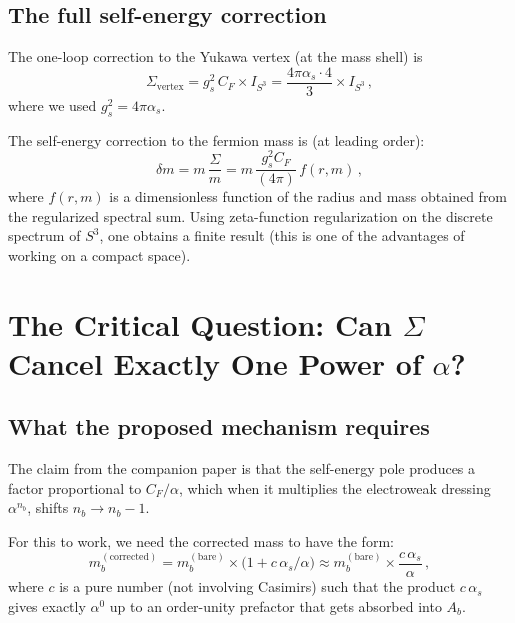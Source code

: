 \documentclass[11pt,a4paper]{article}
\theoremstyle{definition}
\theoremstyle{remark}
\begin{document}
\subsection{The full self-energy correction}
\label{sec:full-sigma}

The one-loop correction to the Yukawa vertex (at the mass shell) is
\begin{equation}\label{eq:sigma-full}
\Sigma_{\mathrm{vertex}} = g_s^2\,C_F \times I_{S^3}
= \frac{4\pi\alpha_s \cdot 4}{3}\times I_{S^3}\,,
\end{equation}
where we used $g_s^2 = 4\pi\alpha_s$.

The self-energy correction to the fermion mass is (at leading order):
\begin{equation}\label{eq:mass-correction}
\delta m = m\,\frac{\Sigma}{m} = m\,\frac{g_s^2 C_F}{(4\pi)}\,f(r,m)\,,
\end{equation}
where $f(r,m)$ is a dimensionless function of the radius and mass
obtained from the regularized spectral sum.  Using zeta-function
regularization on the discrete spectrum of $S^3$, one obtains a finite
result (this is one of the advantages of working on a compact space).

\section{The Critical Question: Can $\Sigma$ Cancel Exactly One Power of $\alpha$?}
\label{sec:critical}

\subsection{What the proposed mechanism requires}

The claim from the companion paper is that the self-energy pole produces
a factor proportional to $C_F/\alpha$, which when it multiplies the
electroweak dressing $\alpha^{n_b}$, shifts $n_b \to n_b - 1$.

For this to work, we need the corrected mass to have the form:
\begin{equation}\label{eq:required}
m_b^{(\mathrm{corrected})} = m_b^{(\mathrm{bare})}\times
\bigl(1 + c\,\alpha_s/\alpha\bigr) \approx m_b^{(\mathrm{bare})}
\times \frac{c\,\alpha_s}{\alpha}\,,
\end{equation}
where $c$ is a pure number (not involving Casimirs) such that the
product $c\,\alpha_s$ gives exactly $\alpha^0$ up to an order-unity
prefactor that gets absorbed into $A_b$.
\end{document}
